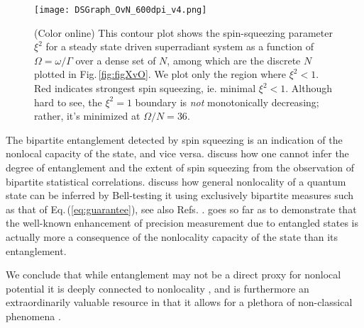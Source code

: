 \documentclass[
  12pt          %
  ,letterpaper  %
  ,center       %
  ,noupper      %
  ,english,fleqn]{uconnthesis}
\newcommand{\ceq}[1]{Eq.\,(\ref{#1})}
\newcommand{\fig}[1]{Fig.\,\ref{#1}}
\begin{document}
\begin{landscape}
\begin{figure}[p]
\texttt{[image: DSGraph\_OvN\_600dpi\_v4.png]}
\caption{(Color online) This contour plot shows the spin-squeezing parameter $\xi^2$ for a steady state driven superradiant system as a function of $\Omega = \omega/\Gamma$ over a dense set of $N$, among which are the discrete $N$ plotted in \fig{fig:figXvO}. %
We plot only the region where $\xi^2<1$. Red indicates strongest spin squeezing, ie. minimal $\xi^2<1$. Although hard to see, the $\xi^2=1$ boundary is {\em not} monotonically decreasing; rather, it's minimized at $\Omega/N=36$.}\label{fig:figOvN}
\end{figure}
\end{landscape}
\restoregeometry


The bipartite entanglement detected by spin squeezing is an indication of the nonlocal capacity of the state, and vice versa. \citet{EntanglementOnlyTwoBodyToth} discuss how one cannot infer the degree of entanglement and the extent of spin squeezing from the observation of bipartite statistical correlations. \citet{AcinDetecting} discuss how general nonlocality of a quantum state can be inferred by Bell-testing it using exclusively bipartite measures such as that of \ceq{eq:guarantee}, see also Refs. \cite{BellTwoBodyOnlyArXiv,BellInequalityHomogenization}. \citet{PrecisionViaNonlocality} goes so far as to demonstrate that the well-known enhancement of precision measurement due to entangled states \cite{SpinSqueezing2001,TothSpinSqueezing,NoriSpinSqueezing,Gross2010Nature,PrecisionToth,Gross2012IOP,FisherPrecisionMeasurement} is actually more a consequence of the nonlocality capacity of the state than its entanglement.


We conclude that while entanglement may not be a direct proxy for nonlocal potential \cite{UPBOriginal,EntanglementSurprise2005,EntanglementSurprise2005b,EntanglementSurprise2007,EntanglementSurprise2011,EntanglementSurprise2014,RandomnessFromNonlocality,SteeringNonlocalityBrunner} it is deeply connected to nonlocality \cite{AllEntangledNonlocality,AllEntangledNonlocal,CloserConnections}, and is furthermore an extraordinarily valuable resource in that it allows for a plethora of non-classical phenomena \cite{CryptoPRA,CryptoPRL,CryptoDIQKD,RenatoQKDNature,DickeNetworking,mosca_algorithms_revisited,MBQC,MBQC2,QuantOptBook,Schumacher2010Quantum,Nielsen2011Quantum,Wilde2013Quantum,SpinSqueezing2001,TothSpinSqueezing,NoriSpinSqueezing,Gross2010Nature,PrecisionToth,Gross2012IOP,FisherPrecisionMeasurement}. 
\end{document}
